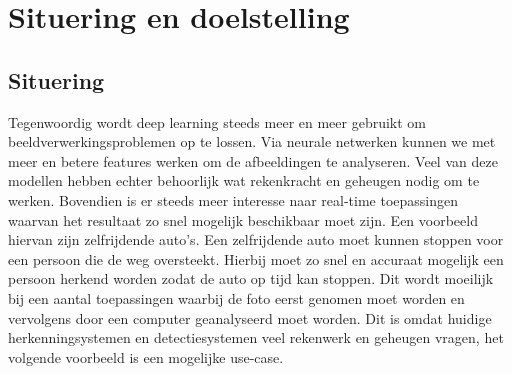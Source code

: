 
\chapter{Situering en doelstelling}

\section{Situering}
Tegenwoordig wordt deep learning steeds meer en meer gebruikt om beeldverwerkingsproblemen op te lossen. 
Via neurale netwerken kunnen we met meer en betere features werken om de afbeeldingen te analyseren. 
Veel van deze modellen hebben echter behoorlijk wat rekenkracht en geheugen nodig om te werken.
Bovendien is er steeds meer interesse naar real-time toepassingen waarvan het resultaat zo snel mogelijk beschikbaar moet zijn.
Een voorbeeld hiervan zijn zelfrijdende auto's.
Een zelfrijdende auto moet kunnen stoppen voor een persoon die de weg oversteekt.
Hierbij moet zo snel en accuraat mogelijk een persoon herkend worden zodat de auto op tijd kan stoppen.
Dit wordt moeilijk bij een aantal toepassingen waarbij de foto eerst genomen moet worden en vervolgens door een computer geanalyseerd moet worden.
Dit is omdat huidige herkenningsystemen en detectiesystemen veel rekenwerk en geheugen vragen, het volgende voorbeeld is een mogelijke use-case. 

